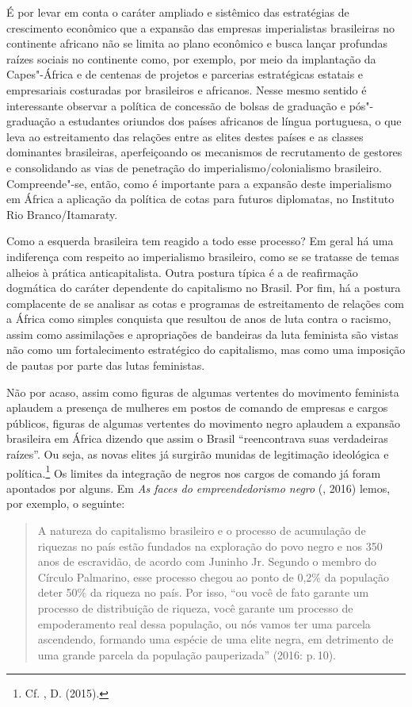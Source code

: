 É por levar em conta o caráter ampliado e sistêmico das estratégias de
crescimento econômico que a expansão das empresas imperialistas
brasileiras no continente africano não se limita ao plano econômico e
busca lançar profundas raízes sociais no continente como, por exemplo,
por meio da implantação da Capes"-África e de centenas de projetos e
parcerias estratégicas estatais e empresariais costuradas por
brasileiros e africanos. Nesse mesmo sentido é interessante observar a
política de concessão de bolsas de graduação e pós"-graduação a
estudantes oriundos dos países africanos de língua portuguesa, o que
leva ao estreitamento das relações entre as elites destes países e as
classes dominantes brasileiras, aperfeiçoando os mecanismos de
recrutamento de gestores e consolidando as vias de penetração do
imperialismo/colonialismo brasileiro. Compreende"-se, então, como é
importante para a expansão deste imperialismo em África a aplicação da
política de cotas para futuros diplomatas, no Instituto Rio
Branco/Itamaraty.

Como a esquerda brasileira tem reagido a todo esse processo? Em geral há
uma indiferença com respeito ao imperialismo brasileiro, como se se
tratasse de temas alheios à prática anticapitalista. Outra postura
típica é a de reafirmação dogmática do caráter dependente do capitalismo
no Brasil. Por fim, há a postura complacente de se analisar as cotas e
programas de estreitamento de relações com a África como simples
conquista que resultou de anos de luta contra o racismo, assim como
assimilações e apropriações de bandeiras da luta feminista são vistas
não como um fortalecimento estratégico do capitalismo, mas como uma
imposição de pautas por parte das lutas feministas.

Não por acaso, assim como figuras de algumas vertentes do movimento
feminista aplaudem a presença de mulheres em postos de comando de
empresas e cargos públicos, figuras de algumas vertentes do movimento
negro aplaudem a expansão brasileira em África dizendo que assim o
Brasil ``reencontrava suas verdadeiras raízes''. Ou seja, as novas
elites já surgirão munidas de legitimação ideológica e
política.\footnote{Cf. , D. (2015).} Os limites da integração de
negros nos cargos de comando já foram apontados por alguns. Em \emph{As
faces do empreendedorismo negro} (, 2016) lemos, por exemplo, o
seguinte:

\begin{quote}
A natureza do capitalismo brasileiro e o processo de acumulação de
riquezas no país estão fundados na exploração do povo negro e nos 350
anos de escravidão, de acordo com Juninho Jr. Segundo o membro do
Círculo Palmarino, esse processo chegou ao ponto de 0,2\% da população
deter 50\% da riqueza no país. Por isso, ``ou você de fato garante um
processo de distribuição de riqueza, você garante um processo de
empoderamento real dessa população, ou nós vamos ter uma parcela
ascendendo, formando uma espécie de uma elite negra, em detrimento de
uma grande parcela da população pauperizada'' (2016: p.\,10).
\end{quote}

